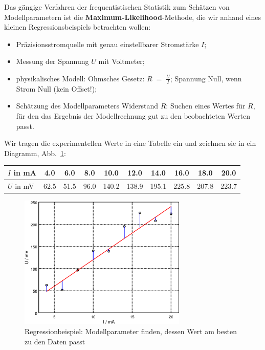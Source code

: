 \documentclass[a4paper,12pt,DIV=15]{scrartcl}
\begin{document}
Das gängige Verfahren der frequentistischen Statistik
zum Schätzen von Modellparametern ist die \textbf{Maximum-Likelihood}-Methode, die wir anhand eines kleinen
Regressionsbeispiels betrachten wollen:
\begin{itemize}
\item Präzisionsstromquelle mit genau einstellbarer Stromstärke $I$;
\item Messung der Spannung $U$ mit Voltmeter;
\item physikalisches Modell: Ohmsches Gesetz: $R \; = \; \frac{U}{I}$; Spannung Null, wenn Strom Null (kein Offset!);
\item Schätzung des Modellparameters Widerstand $R$: Suchen eines Wertes für $R$, für den das
Ergebnis der Modellrechnung \glqq gut zu den beobachteten Werten passt\grqq.
\end{itemize}
Wir tragen die experimentellen Werte
in eine Tabelle ein und zeichnen sie in ein Diagramm, Abb.~\ref{Ohm1}:

\begin{center}
\begin{tabular}{l||c|c|c|c|c|c|c|c|c}
\hline\hline
 $I$ in mA & 4.0 &     6.0 &     8.0 &    10.0 &    12.0 &    14.0 &    16.0 &    18.0 &    20.0 \\
\hline
 $U$ in mV & 62.5 &    51.5 &    96.0 &   140.2 &   138.9 &   195.1 &   225.8 &   207.8 &   223.7 \\
\hline\hline
\end{tabular}
\end{center}

\begin{figure}
\begin{center}
\includegraphics[width=80mm]{media/learn_estimation_ohm.eps}
\caption{Regressionbeispiel: Modellparameter finden, dessen Wert am besten zu den Daten passt}
\label{Ohm1}
\end{center}
\end{figure}
\end{document}
